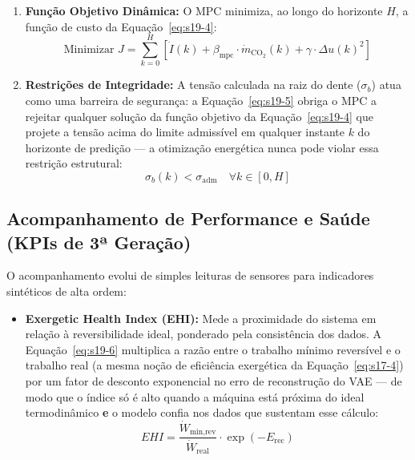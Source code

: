 \documentclass[12pt,a4paper]{article}
\numberwithin{equation}{section}
\numberwithin{table}{section}
\numberwithin{figure}{section}
\begin{document}
{\begin{enumerate}
	\item \textbf{Função Objetivo Dinâmica:} O MPC minimiza, ao longo do horizonte $H$, a função de custo da Equação~\eqref{eq:s19-4}:
	\begin{equation}\label{eq:s19-4}
 \text{Minimizar } J = \sum_{k=0}^{H} \left[ \dot{I}(k) + \beta_{\text{mpc}} \cdotp \dot{m}_{\text{CO}_2}(k) + \gamma \cdotp \Delta u(k)^2 \right]
\end{equation}
	
	\item \textbf{Restrições de Integridade:}
	A tensão calculada na raiz do dente ($\sigma_b$) atua como uma barreira de segurança: a Equação~\eqref{eq:s19-5} obriga o MPC a rejeitar qualquer solução da função objetivo da Equação~\eqref{eq:s19-4} que projete a tensão acima do limite admissível em qualquer instante $k$ do horizonte de predição — a otimização energética nunca pode violar essa restrição estrutural:
	\begin{equation}\label{eq:s19-5}
 \sigma_b(k) < \sigma_{\text{adm}} \quad \forall k \in [0, H]
\end{equation}
\end{enumerate}

\subsection{Acompanhamento de Performance e Saúde (KPIs de 3ª Geração)}

O acompanhamento evolui de simples leituras de sensores para indicadores sintéticos de alta ordem:

\begin{itemize}
	\item \textbf{Exergetic Health Index (EHI):} Mede a proximidade do sistema em relação à reversibilidade ideal, ponderado pela consistência dos dados. A Equação~\eqref{eq:s19-6} multiplica a razão entre o trabalho mínimo reversível e o trabalho real (a mesma noção de eficiência exergética da Equação~\eqref{eq:s17-4}) por um fator de desconto exponencial no erro de reconstrução do VAE — de modo que o índice só é alto quando a máquina está próxima do ideal termodinâmico \textbf{e} o modelo confia nos dados que sustentam esse cálculo:
	\begin{equation}\label{eq:s19-6}
 EHI = \frac{\dot{W}_{\text{min,rev}}}{\dot{W}_{\text{real}}} \cdotp \exp(-E_{\text{rec}})
\end{equation}
	

\end{itemize}}
\end{document}
